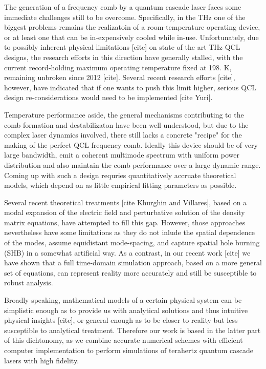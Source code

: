 \documentclass[journal]{IEEEtran}
\begin{document}
The generation of a frequency comb by a quantum cascade laser faces some immediate challenges still to be overcome. Specifically, in the THz one of the biggest problems remains the realizatoin of a room-temperature operating device, or at least one that can be in-expensively cooled while in-use. Unfortunately, due to possibly inherent physical limitations [cite] on state of the art THz QCL designs, the research efforts in this direction have generally stalled, with the current record-holding maximum operating temperature fixed at 198. K, remaining unbroken since 2012 [cite]. Several recent research efforts [cite], however, have indicated that if one wants to push this limit higher, serious QCL design re-considerations would need to be implemented [cite Yuri].

Temperature performance aside, the general mechanisms contributing to the comb formation and destabilizaton have been well understood, but due to the complex laser dynamics involved, there still lacks a concrete "recipe" for the making of the perfect QCL frequency comb. Ideally this device should be of very large bandwidth, emit a coherent multimode spectrum with uniform power distribution and also maintain the comb performance over a large dynamic range. Coming up with such a design requries quantitatively accruate theoretical models, which depend on as little empirical fitting parameters as possible.

Several recent theoretical treatments [cite Khurghin and Villares], based on a modal expansion of the electric field and perturbative solution of the density matrix equations, have attempted to fill this gap. However, those approaches nevertheless have some limitations as they do not inlude the spatial dependence of the modes, assume equidistant mode-spacing, and capture spatial hole burning (SHB) in a somewhat artificial way. As a contrast, in our recent work [cite] we have shown that a full time-domain simulation approach, based on a more general set of equations, can represent reality more accurately and still be susceptible to robust analysis.

Broadly speaking, mathematical models of a certain physical system can be simplistic enough as to provide us with analytical solutions and thus intuitive physical insights [cite], or general enough as to be closer to reality but less susceptible to analytical treatment. Therefore our work is based in the latter part of this dichtonomy, as we combine accurate numerical schemes with efficient computer implementation to perform simulations of terahertz quantum cascade lasers with high fidelity.
\end{document}
